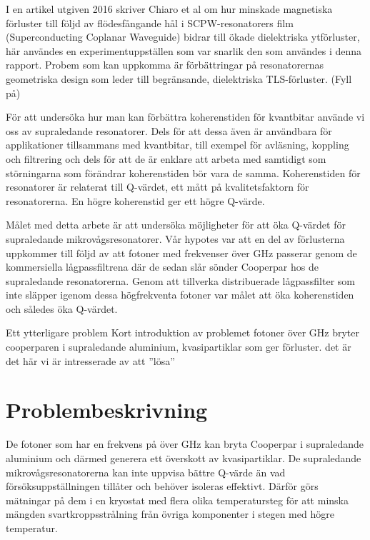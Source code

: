 \documentclass[main.tex]{subfiles}
\begin{document}
I en artikel utgiven 2016 skriver Chiaro et al om hur minskade magnetiska förluster till följd av flödesfångande hål i SCPW-resonatorers film (Superconducting Coplanar Waveguide) bidrar till ökade dielektriska ytförluster, här användes en experimentuppställen som var snarlik den som användes i denna rapport. Probem som kan uppkomma är förbättringar på resonatorernas geometriska design som leder till begränsande, dielektriska TLS-förluster. (Fyll på)


För att undersöka hur man kan förbättra koherenstiden för kvantbitar använde vi oss av supraledande resonatorer. Dels för att dessa även är användbara för applikationer tillsammans med kvantbitar, till exempel för avläsning, koppling och filtrering \cite{placeholder} och dels för att de är enklare att arbeta med samtidigt som störningarna som förändrar koherenstiden bör vara de samma\cite{Oliver2013}. Koherenstiden för resonatorer är relaterat till Q-värdet, ett mått på kvalitetsfaktorn för resonatorerna. En högre koherenstid ger ett högre Q-värde.


Målet med detta arbete är att undersöka möjligheter för att öka Q-värdet för supraledande mikrovågsresonatorer. Vår hypotes var att en del av förlusterna uppkommer till följd av att fotoner med frekvenser över \unit[100]{GHz} passerar genom de kommersiella lågpassfiltrena där de sedan slår sönder Cooperpar hos de supraledande resonatorerna. Genom att tillverka distribuerade lågpassfilter som inte släpper igenom dessa högfrekventa fotoner var målet att öka koherenstiden och således öka Q-värdet.





Ett ytterligare problem Kort introduktion av problemet
fotoner över \unit[88]{GHz} bryter cooperparen i supraledande aluminium, kvasipartiklar som ger förluster.
det är det här vi är intresserade av att ''lösa''

\section{Problembeskrivning}
De fotoner som har en frekvens på över \unit[88]{GHz} kan bryta Cooperpar i supraledande aluminium och därmed generera ett överskott av kvasipartiklar. De supraledande mikrovågsresonatorerna kan inte uppvisa bättre Q-värde än vad försöksuppställningen tillåter och behöver isoleras effektivt. Därför görs mätningar på dem i en kryostat med flera olika temperatursteg för att minska mängden svartkroppsstrålning från övriga komponenter i stegen med högre temperatur. 
\end{document}
